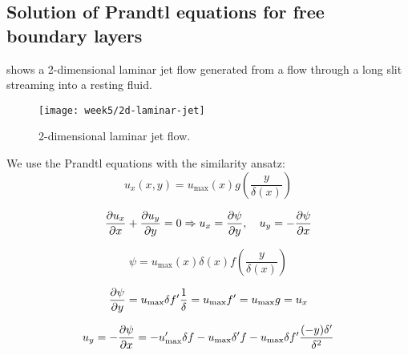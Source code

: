 \subsection{Solution of Prandtl equations for free boundary layers}
 shows a 2-dimensional laminar jet flow generated from a flow through a long slit streaming into a resting fluid.
\begin{figure}[!h]
    \centering
    \texttt{[image: week5/2d-laminar-jet]}\\
    \caption{2-dimensional laminar jet flow.}
    \label{fig:2d-laminar-jet}
\end{figure}

We use the Prandtl equations with the similarity ansatz:
\begin{equation}
u_x(x,y)=u_\mathrm{max}(x)g\left(\frac{y}{\delta(x)}\right)
\end{equation}

\begin{equation}
\frac{\partial u_x}{\partial x}+\frac{\partial u_y}{\partial y}=0 \Rightarrow u_x=\frac{\partial \psi}{\partial y},\quad u_y=-\frac{\partial \psi}{\partial x}
\end{equation}

\begin{equation}
\psi = u_\mathrm{max}(x)\delta(x)f\left(\frac{y}{\delta(x)}\right)
\end{equation}

\begin{equation}
\frac{\partial \psi}{\partial y}=u_\mathrm{max}\delta f'\frac{1}{\delta}=u_\mathrm{max}f'=u_\mathrm{max}g=u_x
\end{equation}

\begin{equation}
u_y=-\frac{\partial \psi}{\partial x}=-u'_\mathrm{max}\delta f-u_\mathrm{max}\delta'f-u_\mathrm{max}\delta f'\frac{(-y)\delta'}{\delta^2}
\end{equation}

